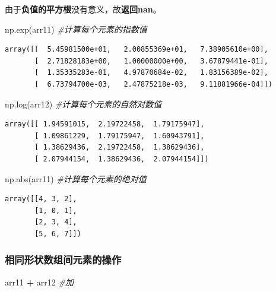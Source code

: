 \documentclass[]{article}
\newenvironment{Shaded}{\begin{snugshade}}{\end{snugshade}}
\newcommand{\CommentTok}[1]{\textcolor[rgb]{0.56,0.35,0.01}{\textit{#1}}}
\newcommand{\OperatorTok}[1]{\textcolor[rgb]{0.81,0.36,0.00}{\textbf{#1}}}
\newcommand{\BuiltInTok}[1]{#1}
\newcommand{\NormalTok}[1]{#1}
\begin{document}
由于\textbf{负值的平方根}没有意义，故\textbf{返回nan}。

\begin{Shaded}
\begin{Highlighting}[]
\NormalTok{np.exp(arr11) }\CommentTok{#计算每个元素的指数值}
\end{Highlighting}
\end{Shaded}

\begin{verbatim}
array([[  5.45981500e+01,   2.00855369e+01,   7.38905610e+00],
       [  2.71828183e+00,   1.00000000e+00,   3.67879441e-01],
       [  1.35335283e-01,   4.97870684e-02,   1.83156389e-02],
       [  6.73794700e-03,   2.47875218e-03,   9.11881966e-04]])
\end{verbatim}

\begin{Shaded}
\begin{Highlighting}[]
\NormalTok{np.log(arr12) }\CommentTok{#计算每个元素的自然对数值}
\end{Highlighting}
\end{Shaded}

\begin{verbatim}
array([[ 1.94591015,  2.19722458,  1.79175947],
       [ 1.09861229,  1.79175947,  1.60943791],
       [ 1.38629436,  2.19722458,  1.38629436],
       [ 2.07944154,  1.38629436,  2.07944154]])
\end{verbatim}

\begin{Shaded}
\begin{Highlighting}[]
\NormalTok{np.}\BuiltInTok{abs}\NormalTok{(arr11) }\CommentTok{#计算每个元素的绝对值}
\end{Highlighting}
\end{Shaded}

\begin{verbatim}
array([[4, 3, 2],
       [1, 0, 1],
       [2, 3, 4],
       [5, 6, 7]])
\end{verbatim}

\subsubsection{相同形状数组间元素的操作}

\begin{Shaded}
\begin{Highlighting}[]
\NormalTok{arr11 }\OperatorTok{+}\NormalTok{ arr12 }\CommentTok{#加}
\end{Highlighting}
\end{Shaded}
\end{document}
